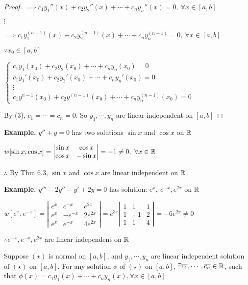 \begin{proof}
	$\implies c_1y_1''(x) + c_2y_2''(x) + \cdots + c_ny_n''(x) = 0,~\forall x \in [a,b]$
	
	$\vdots$
	
	$\implies c_1y_1^{(n-1)}(x) + c_2y_2^{(n-1)}(x) + \cdots + c_ny_n^{(n-1)} = 0 ,~\forall x \in [a,b]$
	
	$\because x_0 \in [a,b]$
	
	$\begin{cases}
		c_1y_1(x_0) + c_2y_2(x_0) + \cdots + c_ny_n(x_0) = 0\\
		c_1y_1'(x_0) + c_2y_2'(x_0) + \cdots + c_ny_n'(x_0) = 0\\
		\vdots \\
		c_1y^{n-1}(x_0) + c_2y^{(n-1)}(x_0) + \cdots + c_ny_n^{(n-1)}(x_0) = 0
	\end{cases}$
	
	By (3), $c_1 = \cdots = c_n = 0$. So $y_1,\cdots,y_n$ are linear independent on $[a,b]$
\end{proof}

\textbf{Example.} $y'' + y = 0$ has two solutions $\sin x$ and $\cos x$ on $\mathbb{R}$

$w[\sin x , \cos x] = \left|\begin{matrix}
	\sin x & \cos x\\
	\cos x & -\sin x
\end{matrix}\right| = -1 \neq 0,~\forall x \in \mathbb{R}$

$\therefore$ By Thm 6.3, $\sin x$ and $\cos x$ are linear independent on $\mathbb{R}$

\textbf{Example.} $y''' - 2y'' - y' + 2y = 0$ has solution: $e^x ,~ e^{-x},e^{2x}$ on $\mathbb{R}$

$w[e^x,e^{-x}] = \left| \begin{matrix}
	e^x & e^{-x} & e^{2x} \\
	e^x & -e^{-x} & 2e^{2x} \\
	e^x & e^{-x} & 4e^{2x}
\end{matrix} \right| = e^{3x} \left| \begin{matrix}
	1 & 1 & 1\\
	1 & -1 & 2\\
	1 & 1 & 4
\end{matrix}\right| = -6e^{2x} \neq 0$

$\therefore e^{-x},e^{-x},e^{2x}$ are linear independent on $\mathbb{R}$

\begin{thm*}
	Suppose $(\star)$ is normal on $[a,b]$, and $y_1,\cdots,y_n$ are linear independent solution of $(\star)$ on $[a,b]$. For any solution $\phi$ of $(\star)$ on $[a,b]$, $\exists \overline{c_1},\cdots,\overline{c_n} \in \mathbb{R}$, such that $\phi (x) = \overline{c_1}y_1(x) + \cdots + \overline{c_n}y_n(x), \forall x \in [a,b]$
\end{thm*}

